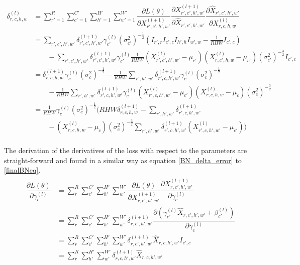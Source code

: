 \documentclass[a4paper, twoside]{article}
\newcommand*{\pd}[2]{\ensuremath{\dfrac{\partial #1}{\partial #2}}}
\begin{document}
\begin{equation}\label{finalBNeq}
\begin{split}
	\delta^{(l)}_{r,c,h,w} 
	& = \sum^{R }_{r'=1} \sum^{C' }_{c'=1} \sum^{H' }_{h'=1} \sum^{W' }_{w'=1} \pd{L(\theta)}{X^{(l+1)}_{r',c',h',w'}} \pd{X^{(l+1)}_{r',c',h',w'}}{\hat{X}_{r',c',h',w'}} \pd{\hat{X}_{r',c',h',w'}}{{X}^{(l)}_{r,c,h,w}}\\
	& = \sum\limits_{r',c',h',w'}\delta^{(l+1)}_{r',c',h',w'} \gamma^{(l)}_{c'} {(\sigma^2_{c'})}^{-\frac{1}{2}} (I_{r',r} I_{c',c} I_{h',h} I_{w',w} - \frac{1}{RHW} I_{c',c}) \\
	& \qquad -\sum\limits_{r',c',h',w'}\delta^{(l+1)}_{r',c',h',w'} \gamma^{(l)}_{c'} \frac{1}{RHW} ({X^{(l)}_{r',c',h',w'} - \mu_{c'}})({X^{(l)}_{r,c',h,w} - \mu_{c'}}) {(\sigma^2_{c'})}^{-\frac{3}{2}} I_{c',c} \\
	& = \delta^{(l+1)}_{r,c,h,w} \gamma^{(l)}_{c} {(\sigma^2_{c})}^{-\frac{1}{2}} - \frac{1}{RHW} \sum\limits_{r',h',w'} \delta^{(l+1)}_{r',c,h',w'} \gamma^{(l)}_{c} {(\sigma^2_{c})}^{-\frac{1}{2}}\\
	& \qquad - \frac{1}{RHW} \sum\limits_{r',h',w'} \delta^{(l+1)}_{r',c,h',w'}\gamma^{(l)}_{c} ({X^{(l)}_{r',c,h',w'} - \mu_{c'}})({X^{(l)}_{r,c,h,w} - \mu_{c}}){(\sigma^2_{c})}^{-\frac{3}{2}} \\
	& = \frac{1}{RHW} \gamma^{(l)}_c {(\sigma^2_{c})}^{-\frac{1}{2}} \biggl(    RHW \delta^{(l+1)}_{r,c,h,w} -  \sum\limits_{r',h',w'} \delta^{(l+1)}_{r',c,h',w'} \qquad \\
	& \qquad -  ({X^{(l)}_{r,c,h,w} - \mu_{c}}) {(\sigma^2_{c})}^{-\frac{3}{2}} \sum\limits_{r',h',w'} \delta^{(l+1)}_{r',c,h',w'} ({X^{(l)}_{r',c,h',w'} - \mu_{c'}}) \biggl) \\
\end{split}
\end{equation}

The derivation of the derivatives of the loss with respect to the parameters are straight-forward and found in a similar way as equation \eqref{BN_delta_error} to \eqref{finalBNeq}. \cite{webBN1} \cite{webBN2}
\begin{align}
\begin{split}
	\pd{L(\theta)}{\gamma^{(l)}_{c}}
		& = \sum^{R }_{r} \sum^{C' }_{c'} \sum^{H' }_{h'} \sum^{W' }_{w'} \pd{L(\theta)}{X^{(l+1)}_{r,c',h',w'}} \pd{X^{(l+1)}_{r,c',h',w'}}{\gamma^{(l)}_{c}} \\
		& = \sum^{R }_{r} \sum^{C' }_{c'} \sum^{H' }_{h'} \sum^{W' }_{w'} \delta^{(l+1)}_{r,c',h',w'}  \pd{({\gamma_{c'}^{(l)} \hat{X}_{r,c',h',w'} + \beta_{c'}^{(l)}})}{\gamma^{(l)}_{c}} \\
		& = \sum^{R }_{r} \sum^{C' }_{c'} \sum^{H' }_{h'} \sum^{W' }_{w'} \delta^{(l+1)}_{r,c',h',w'} \hat{X}_{r,c,h',w'} I_{c',c}\\
		& = \sum^{R }_{r} \sum^{H' }_{h'} \sum^{W' }_{w'} \delta^{(l+1)}_{r,c,h',w'} \hat{X}_{r,c,h',w'} \\
\end{split}
\end{align}
\end{document}
